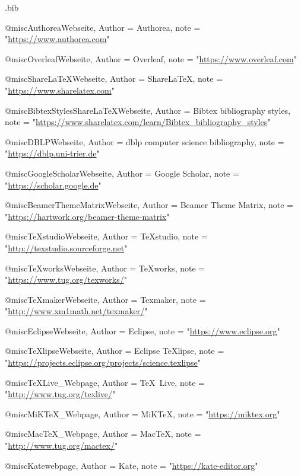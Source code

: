 \documentclass[a4paper,10pt,twoside]{scrbook}
\begin{document}
\normalem   %

\begin{filecontents*}{\jobname.bib}



@misc{AuthoreaWebseite,
	Author = {{Authorea}},
	note = "\url{https://www.authorea.com}"
}

@misc{OverleafWebseite,
	Author = {{Overleaf}},
	note = "\url{https://www.overleaf.com}"
}

@misc{ShareLaTeXWebseite,
	Author = {{ShareLaTeX}},
	note = "\url{https://www.sharelatex.com}"
}


@misc{BibtexStylesShareLaTeXWebseite,
	Author = {{Bibtex bibliography styles}},
	note = "\url{https://www.sharelatex.com/learn/Bibtex_bibliography_styles}"
}

@misc{DBLPWebseite,
	Author = {{dblp computer science bibliography}},
	note = "\url{https://dblp.uni-trier.de}"
}

@misc{GoogleScholarWebseite,
	Author = {{Google Scholar}},
	note = "\url{https://scholar.google.de}"
}

@misc{BeamerThemeMatrixWebseite,
	Author = {{Beamer Theme Matrix}},
	note = "\url{https://hartwork.org/beamer-theme-matrix}"
}

@misc{TeXstudioWebseite,
	Author = {{\TeX studio}},
	note = "\url{http://texstudio.sourceforge.net}"
}
	
@misc{TeXworksWebseite,
	Author = {{TeXworks}},
	note = "\url{https://www.tug.org/texworks/}"
}
	
@misc{TeXmakerWebseite,
        Author = {{Texmaker}},
        note = "\url{http://www.xm1math.net/texmaker/}"
}

@misc{EclipseWebseite,
        Author = {{Eclipse}},
        note = "\url{https://www.eclipse.org}"
}

@misc{TeXlipseWebseite,
        Author = {{Eclipse TeXlipse}},
        note = "\url{https://projects.eclipse.org/projects/science.texlipse}"
}


@misc{TeXLive_Webpage,
        Author = {{\TeX~Live}},
        note = "\url{http://www.tug.org/texlive/}"
}

@misc{MiKTeX_Webpage,
        Author = {{MiK\TeX}},
        note = "\url{https://miktex.org}"
}

@misc{MacTeX_Webpage,
        Author = {{Mac\TeX}},
        note = "\url{http://www.tug.org/mactex/}"
}

@misc{Katewebpage,
	Author = {{Kate}},
	note = "\url{https://kate-editor.org}"
}


\end{filecontents*}
\end{document}
